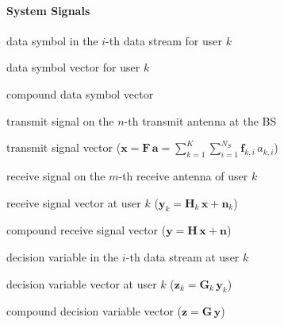 \paragraph*{System Signals}

\begin{description}[labelsep=0.15em, font=\normalfont]
    \newcommand{\symbolsep}{\vspace{0.55em}}

    \item[$ a_{k, \, i} \in \mathbb{C} \quad \text{---} \quad $]   data symbol in the $i$-th data stream for user $k$
    \item[$ \mathbf{a}_k = {[ a_{k, \, 1} \; \dots \; a_{k, \, N_S} ]}^T \in \mathbb{C}^{N_S} \quad \text{---} \quad $]   data symbol vector for user $k$
    \item[$ \mathbf{a} = {[ \mathbf{a}_1^T \; \dots \; \mathbf{a}_K^T ]}^T \in \mathbb{C}^{KN_S} \quad \text{---} \quad $]   compound data symbol vector
    \symbolsep

    \item[$ x_n \in \mathbb{C} \quad \text{---} \quad $]   transmit signal on the $n$-th transmit antenna at the \acs{BS}
    \item[$ \mathbf{x} = {[ x_1 \; \dots \; x_{N_T} ]}^T \in \mathbb{C}^{N_T} \quad \text{---} \quad $]   transmit signal vector \; ($\mathbf{x} = \mathbf{F} \, \mathbf{a} = \sum_{k=1}^{K} \sum_{i=1}^{N_S} \mathbf{f}_{k, i} \, a_{k, i}$)
    \symbolsep
    
    \item[$ y_{k, \, m} \in \mathbb{C} \quad \text{---} \quad $]   receive signal on the $m$-th receive antenna of user $k$
    \item[$ \mathbf{y}_k = {[ y_{k, \, 1} \; \dots \; y_{k, \, N_R} ]}^T \in \mathbb{C}^{N_R} \quad \text{---} \quad $]   receive signal vector at user $k$ \; ($\mathbf{y}_k = \mathbf{H}_k \, \mathbf{x} + \mathbf{n}_k$)
    \item[$ \mathbf{y} = {[ \mathbf{y}_1^T \; \dots \; \mathbf{y}_K^T ]}^T \in \mathbb{C}^{KN_R} \quad \text{---} \quad $]   compound receive signal vector \; ($\mathbf{y} = \mathbf{H} \, \mathbf{x} + \mathbf{n}$)
    \symbolsep

    \vspace{1cm}
    \item[$ z_{k, \, i} \in \mathbb{C} \quad \text{---} \quad $]   decision variable in the $i$-th data stream at user $k$
    \item[$ \mathbf{z}_k = {[ z_{k, \, 1} \; \dots \; z_{k, \, N_S} ]}^T \in \mathbb{C}^{N_S} \quad \text{---} \quad $]   decision variable vector at user $k$ \; ($\mathbf{z}_k = \mathbf{G}_k \, \mathbf{y}_k$)
    \item[$ \mathbf{z} = {[ \mathbf{z}_1^T \; \dots \; \mathbf{z}_K^T ]}^T \in \mathbb{C}^{KN_S} \quad \text{---} \quad $]   compound decision variable vector \; ($\mathbf{z} = \mathbf{G} \, \mathbf{y}$)
    \symbolsep

\end{description}

